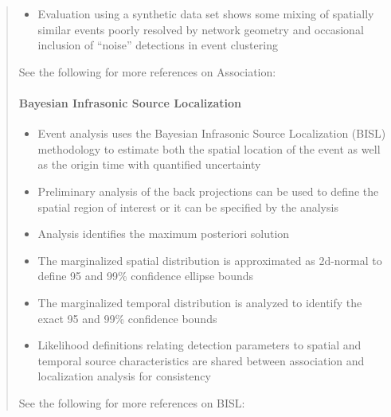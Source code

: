 \documentclass[letterpaper,10pt,english]{sphinxmanual}
\begin{document}
\begin{itemize}
\begin{quote}
\begin{itemize}
\item {} 
Evaluation using a synthetic data set shows some mixing of spatially similar events poorly resolved by network geometry and occasional inclusion of “noise” detections in event clustering

\end{itemize}

See the following for more references on Association:


\paragraph{Bayesian Infrasonic Source Localization}
\label{\detokenize{localization:bayesian-infrasonic-source-localization}}\label{\detokenize{localization:localization}}\label{\detokenize{localization::doc}}\begin{itemize}
\item {} 
Event analysis uses the Bayesian Infrasonic Source Localization (BISL) methodology to estimate both the spatial location of the event as well as the origin time with quantified uncertainty

\item {} 
Preliminary analysis of the back projections can be used to define the spatial region of interest or it can be specified by the analysis

\item {} 
Analysis identifies the maximum posteriori solution

\item {} 
The marginalized spatial distribution is approximated as 2d-normal to define 95 and 99\% confidence ellipse bounds

\item {} 
The marginalized temporal distribution is analyzed to identify the exact 95 and 99\% confidence bounds

\item {} 
Likelihood definitions relating detection parameters to spatial and temporal source characteristics are shared between association and localization analysis for consistency

\end{itemize}

See the following for more references on BISL:
\end{quote}

\end{itemize}
\end{document}
